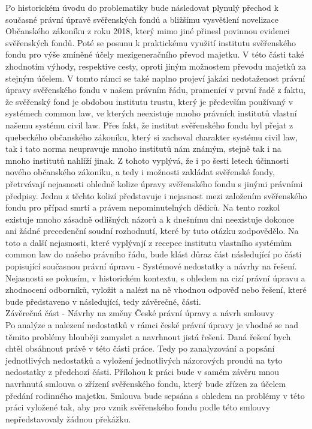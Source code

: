 \documentclass{article}
\begin{document}
Po historickém úvodu do problematiky bude následovat plynulý přechod k současné právní úpravě svěřenských fondů a bližšímu vysvětlení novelizace Občanského zákoníku z roku 2018, který mimo jiné přinesl povinnou evidenci svěřenských fondů. Poté se posunu k praktickému využití institutu svěřenského fondu pro výše zmíněné účely mezigeneračního převod majetku. V této části také zhodnotím výhody, respektive cesty, oproti jiným možnostem převodu majetků za stejným účelem. V tomto rámci se také naplno projeví jakási nedotaženost právní úpravy svěřenského fondu v našem právním řádu, pramenící v první řadě z faktu, že svěřenský fond je obdobou institutu trustu, který je především používaný v systémech common law, ve kterých neexistuje mnoho právních institutů vlastní našemu systému civil law. Přes fakt, že institut svěřenského fondu byl přejat z quebeckého občanského zákoníku, který si zachoval charakter systému civil law, tak i tato norma neupravuje mnoho institutů nám známým, stejně tak i na mnoho institutů nahlíží jinak. Z tohoto vyplývá, že i po šesti letech účinnosti nového občanského zákoníku, a tedy i možnosti zakládat svěřenské fondy, přetrvávají nejasnosti ohledně kolize úpravy svěřenského fondu s jinými právními předpisy. Jednu z těchto kolizí představuje i nejasnost mezi založením svěřenského fondu pro případ smrti a právem nepominutelných dědiců. Na tento rozkol existuje mnoho zásadně odlišných názorů a k dnešnímu dni neexistuje dokonce ani žádné precedenční soudní rozhodnutí, které by tuto otázku zodpovědělo. Na toto a další nejasnosti, které vyplývají z recepce institutu vlastního systémům common law do našeho právního řádu, bude klást důraz část následující po části popisující současnou právní úpravu - Systémové nedostatky a návrhy na řešení. Nejasnosti se pokusím, v historickém kontextu, s ohledem na cizí právní úpravu a zhodnocení odborníků, vyložit a nalézt na ně vhodnou odpověď nebo řešení, které bude představeno v následující, tedy závěrečné, části. \\

{\Large Závěrečná část - Návrhy na změny České právní úpravy a návrh smlouvy}\\


Po analýze a nalezení nedostatků v rámci české právní úpravy je vhodné se nad těmito problémy hlouběji zamyslet a navrhnout jistá řešení. Daná řešení bych chtěl obsáhnout právě v této části práce. Tedy po zanalyzování a popsání jednotlivých nedostatků a vyložení jednotlivých názorových proudů na tyto nedostatky z předchozí části. Přílohou k práci bude v samém závěru mnou navrhnutá smlouva o zřízení svěřenského fondu, který bude zřízen za účelem předání rodinného majetku. Smlouva bude sepsána s ohledem na problémy v této práci vyložené tak, aby pro vznik svěřenského fondu podle této smlouvy nepředstavovaly žádnou překážku.
\end{document}
